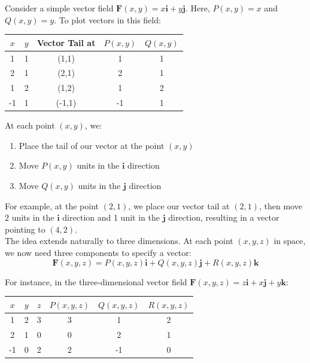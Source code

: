\noindent Consider a simple vector field $\mathbf{F}(x,y) = x\mathbf{i} + y\mathbf{j}$. Here, $P(x,y) = x$ and $Q(x,y) = y$. To plot vectors in this field:

\begin{center}
\begin{tabular}{|c|c||c|c|c|}
\hline
$x$ & $y$ & Vector Tail at & $P(x,y)$ & $Q(x,y)$ \\
\hline
1 & 1 & (1,1) & 1 & 1 \\
2 & 1 & (2,1) & 2 & 1 \\
1 & 2 & (1,2) & 1 & 2 \\
-1 & 1 & (-1,1) & -1 & 1 \\
\hline
\end{tabular}
\end{center}

\noindent At each point $(x,y)$, we:
\begin{enumerate}
   \item Place the tail of our vector at the point $(x,y)$
   \item Move $P(x,y)$ units in the $\mathbf{i}$ direction
   \item Move $Q(x,y)$ units in the $\mathbf{j}$ direction
\end{enumerate}

\noindent For example, at the point $(2,1)$, we place our vector tail at $(2,1)$, then move 2 units in the $\mathbf{i}$ direction and 1 unit in the $\mathbf{j}$ direction, resulting in a vector pointing to $(4,2)$. \\

\noindent The idea extends naturally to three dimensions. At each point $(x,y,z)$ in space, we now need three components to specify a vector:
\[
\mathbf{F}(x,y,z) = P(x,y,z)\mathbf{i} + Q(x,y,z)\mathbf{j} + R(x,y,z)\mathbf{k}
\]

\noindent For instance, in the three-dimensional vector field $\mathbf{F}(x,y,z) = z\mathbf{i} + x\mathbf{j} + y\mathbf{k}$:

\begin{center}
\begin{tabular}{|c|c|c||c|c|c|}
\hline
$x$ & $y$ & $z$ & $P(x,y,z)$ & $Q(x,y,z)$ & $R(x,y,z)$ \\
\hline
1 & 2 & 3 & 3 & 1 & 2 \\
2 & 1 & 0 & 0 & 2 & 1 \\
-1 & 0 & 2 & 2 & -1 & 0 \\
\hline
\end{tabular}
\end{center}

